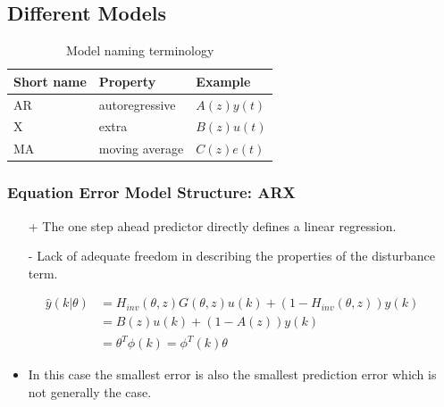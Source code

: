 \documentclass[10pt,a4paper]{scrartcl}
\begin{document}
\begin{multicols*}{2}
\subsection{Different Models}

\begin{table}[H]
\begin{center}
\begin{tabular}{lll}
Short name&Property&Example\\
\hline
AR&autoregressive&$A(z)y(t)$\\
X&extra&$B(z)u(t)$\\
MA&moving average&$C(z)e(t)$\\\hline
\end{tabular}
\end{center}
\caption{Model naming terminology}
\end{table}

\subsubsection{Equation Error Model Structure: ARX}




\begin{itemize}
\item[+] The one step ahead predictor directly defines a linear regression.
\item[-] Lack of adequate freedom in describing the properties of the disturbance term.
\end{itemize}

\begin{align*}
\hat{y}(k|\theta)&=H_{inv}(\theta,z)G(\theta,z)u(k)+(1-H_{inv}(\theta,z))y(k)\\
&=B(z)u(k)+(1-A(z))y(k)\\
&=\theta^T\phi(k)=\phi^T(k)\theta
\end{align*}


\begin{itemize}
\item In this case the smallest error is also the smallest prediction error which is not generally the case.
\end{itemize}


\end{multicols*}
\end{document}

